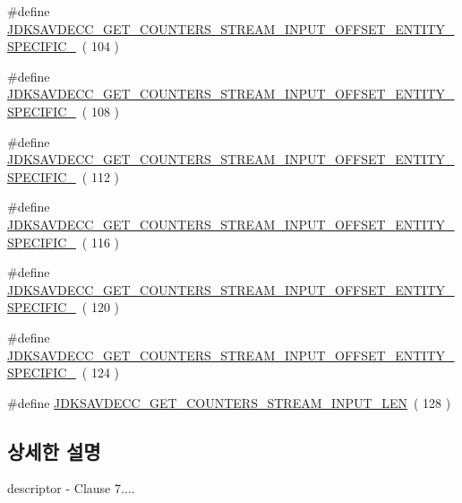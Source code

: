 \begin{DoxyCompactItemize}
\item 
\#define \hyperlink{group__get__counters__stream__input_ga036bf9cdab59270c2246af54a809ad14}{J\+D\+K\+S\+A\+V\+D\+E\+C\+C\+\_\+\+G\+E\+T\+\_\+\+C\+O\+U\+N\+T\+E\+R\+S\+\_\+\+S\+T\+R\+E\+A\+M\+\_\+\+I\+N\+P\+U\+T\+\_\+\+O\+F\+F\+S\+E\+T\+\_\+\+E\+N\+T\+I\+T\+Y\+\_\+\+S\+P\+E\+C\+I\+F\+I\+C\+\_}~( 104 )
\item 
\#define \hyperlink{group__get__counters__stream__input_gafa34fc6bb53fc7ef280e02c7aadf3801}{J\+D\+K\+S\+A\+V\+D\+E\+C\+C\+\_\+\+G\+E\+T\+\_\+\+C\+O\+U\+N\+T\+E\+R\+S\+\_\+\+S\+T\+R\+E\+A\+M\+\_\+\+I\+N\+P\+U\+T\+\_\+\+O\+F\+F\+S\+E\+T\+\_\+\+E\+N\+T\+I\+T\+Y\+\_\+\+S\+P\+E\+C\+I\+F\+I\+C\+\_}~( 108 )
\item 
\#define \hyperlink{group__get__counters__stream__input_ga980fa4e44114c28bb62fd9745f7d2c91}{J\+D\+K\+S\+A\+V\+D\+E\+C\+C\+\_\+\+G\+E\+T\+\_\+\+C\+O\+U\+N\+T\+E\+R\+S\+\_\+\+S\+T\+R\+E\+A\+M\+\_\+\+I\+N\+P\+U\+T\+\_\+\+O\+F\+F\+S\+E\+T\+\_\+\+E\+N\+T\+I\+T\+Y\+\_\+\+S\+P\+E\+C\+I\+F\+I\+C\+\_}~( 112 )
\item 
\#define \hyperlink{group__get__counters__stream__input_gac96430887d5de8cff70a9198b3104847}{J\+D\+K\+S\+A\+V\+D\+E\+C\+C\+\_\+\+G\+E\+T\+\_\+\+C\+O\+U\+N\+T\+E\+R\+S\+\_\+\+S\+T\+R\+E\+A\+M\+\_\+\+I\+N\+P\+U\+T\+\_\+\+O\+F\+F\+S\+E\+T\+\_\+\+E\+N\+T\+I\+T\+Y\+\_\+\+S\+P\+E\+C\+I\+F\+I\+C\+\_}~( 116 )
\item 
\#define \hyperlink{group__get__counters__stream__input_ga1474c26ff739ae19a040f7ddfaa4a6ee}{J\+D\+K\+S\+A\+V\+D\+E\+C\+C\+\_\+\+G\+E\+T\+\_\+\+C\+O\+U\+N\+T\+E\+R\+S\+\_\+\+S\+T\+R\+E\+A\+M\+\_\+\+I\+N\+P\+U\+T\+\_\+\+O\+F\+F\+S\+E\+T\+\_\+\+E\+N\+T\+I\+T\+Y\+\_\+\+S\+P\+E\+C\+I\+F\+I\+C\+\_}~( 120 )
\item 
\#define \hyperlink{group__get__counters__stream__input_ga669039b0bf78e7a5c3ec15985c03d124}{J\+D\+K\+S\+A\+V\+D\+E\+C\+C\+\_\+\+G\+E\+T\+\_\+\+C\+O\+U\+N\+T\+E\+R\+S\+\_\+\+S\+T\+R\+E\+A\+M\+\_\+\+I\+N\+P\+U\+T\+\_\+\+O\+F\+F\+S\+E\+T\+\_\+\+E\+N\+T\+I\+T\+Y\+\_\+\+S\+P\+E\+C\+I\+F\+I\+C\+\_}~( 124 )
\item 
\#define \hyperlink{group__get__counters__stream__input_ga5ac227f822340cd16f096dd5a85e9696}{J\+D\+K\+S\+A\+V\+D\+E\+C\+C\+\_\+\+G\+E\+T\+\_\+\+C\+O\+U\+N\+T\+E\+R\+S\+\_\+\+S\+T\+R\+E\+A\+M\+\_\+\+I\+N\+P\+U\+T\+\_\+\+L\+EN}~( 128 )
\end{DoxyCompactItemize}


\subsection{상세한 설명}
descriptor -\/ Clause 7.... 

